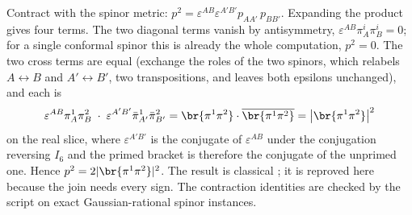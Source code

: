 Contract with the spinor metric: $p^{2} = \varepsilon^{AB}\varepsilon^{A'B'} p_{AA'}\, p_{BB'}$. Expanding the product gives four terms. The two diagonal terms vanish by antisymmetry, $\varepsilon^{AB}\pi^{i}_{A}\pi^{i}_{B} = 0$; for a single conformal spinor this is already the whole computation, $p^{2} = 0$. The two cross terms are equal (exchange the roles of the two spinors, which relabels $A \leftrightarrow B$ and $A' \leftrightarrow B'$, two transpositions, and leaves both epsilons unchanged), and each is
\[
\varepsilon^{AB}\pi^{1}_{A}\pi^{2}_{B}\;\cdot\;\varepsilon^{A'B'}\bar\pi^{1}_{A'}\bar\pi^{2}_{B'}
= \br{\pi^{1}\pi^{2}}\cdot\overline{\br{\pi^{1}\pi^{2}}}
= \bigl|\br{\pi^{1}\pi^{2}}\bigr|^{2}
\]
on the real slice, where $\varepsilon^{A'B'}$ is the conjugate of $\varepsilon^{AB}$ under the conjugation reversing $I_{6}$ and the primed bracket is therefore the conjugate of the unprimed one. Hence $p^{2} = 2|\br{\pi^{1}\pi^{2}}|^{2}$. The result is classical \cite{Hughston1979}; it is reproved here because the join needs every sign. The contraction identities are checked by the script on exact Gaussian-rational spinor instances.
